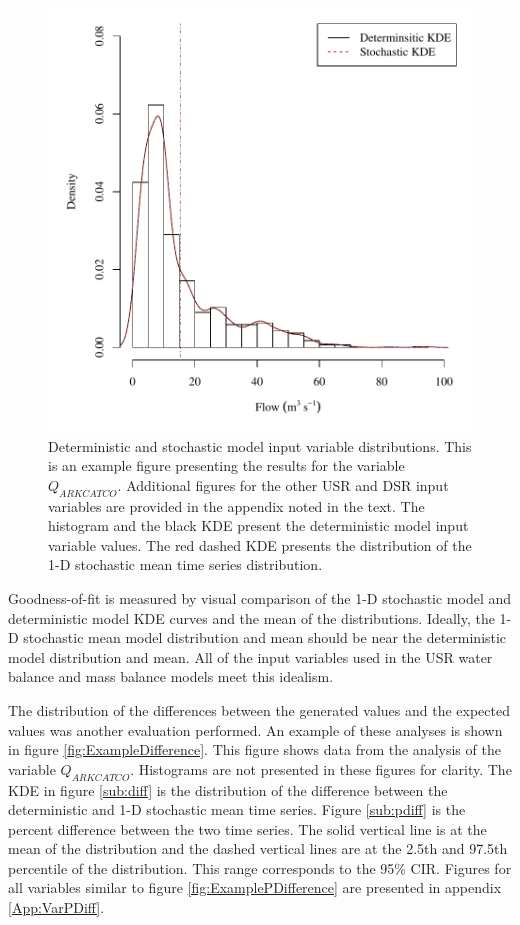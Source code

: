 \begin{linenumbers}
\begin{figure}[htbp]
\centering
	\includegraphics[width=6in]{"Figures/Results_USR/V density qin"}
	\caption[Deterministic and stochastic model input variable distributions.]{Deterministic and stochastic model input variable distributions.  This is an example figure presenting the results for the variable $Q_{ARKCATCO}$.  Additional figures for the other USR and DSR input variables are provided in the appendix noted in the text.  The histogram and the black KDE present the deterministic model input variable values.  The red dashed KDE presents the distribution of the 1-D stochastic mean time series distribution.}
	\label{fig:ExampleDensity}
\end{figure}

Goodness-of-fit is measured by visual comparison of the 1-D stochastic model and deterministic model KDE curves and the mean of the distributions.  Ideally, the 1-D stochastic mean model distribution and mean should be near the deterministic model distribution and mean.  All of the input variables used in the USR water balance and mass balance models meet this idealism.

The distribution of the differences between the generated values and the expected values was another evaluation performed.  An example of these analyses is shown in figure \ref{fig:ExampleDifference}.  This figure shows data from the analysis of the variable $Q_{ARKCATCO}$.  Histograms are not presented in these figures for clarity.  The KDE in figure \ref{sub:diff} is the distribution of the difference between the deterministic and 1-D stochastic mean time series.  Figure \ref{sub:pdiff} is the percent difference between the two time series.  The solid vertical line is at the mean of the distribution and the dashed vertical lines are at the 2.5th and 97.5th percentile of the distribution.  This range corresponds to the 95\% CIR.  Figures for all variables similar to figure \ref{fig:ExamplePDifference} are presented in appendix \ref{App:VarPDiff}.


\end{linenumbers}
